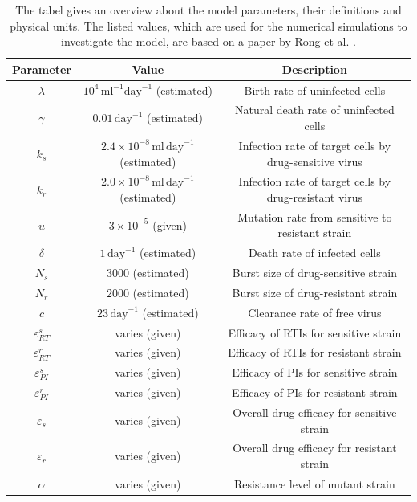 \renewcommand{\arraystretch}{1.25}
\begin{table}
    \centering
        \begin{tabular}{ ccc }
        \hline
        \hline
        Parameter & Value & Description\\[0.5ex]
        \hline
        $\lambda$   & $10^4\,\text{ml}^{-1}\text{day}^{-1}$ (estimated)& Birth rate of uninfected cells\\
        $\gamma$   & $0.01\,\text{day}^{-1}$  (estimated)& Natural death rate of uninfected cells\\
        $k_s$   & $2.4 \times 10^{-8}\,\text{ml}\,\text{day}^{-1}$  (estimated)& Infection rate of target cells by drug-sensitive virus\\
        $k_r$   & $2.0 \times 10^{-8}\,\text{ml}\,\text{day}^{-1}$  (estimated)& Infection rate of target cells by drug-resistant virus\\
        $u$   & $3 \times 10^{-5}$  (given)& Mutation rate from sensitive to resistant strain\\
        $\delta$   & $1\,\text{day}^{-1}$  (estimated)& Death rate of infected cells\\
        $N_s$   & $3000$ (estimated)& Burst size of drug-sensitive strain\\
        $N_r$   & $2000$ (estimated)& Burst size of drug-resistant strain\\
        $c$   & $23\, \text{day}^{-1}$  (estimated)& Clearance rate of free virus\\
        $\varepsilon_{RT}^{s}$  & varies (given)& Efficacy of RTIs for sensitive strain\\
        $\varepsilon_{RT}^{r}$  & varies (given)& Efficacy of RTIs for resistant strain\\
        $\varepsilon_{PI}^{s}$  & varies (given)& Efficacy of PIs for sensitive strain\\
        $\varepsilon_{PI}^{r}$  & varies (given)& Efficacy of PIs for resistant strain\\
        $\varepsilon_{s}$  & varies (given)& Overall drug efficacy for sensitive strain\\
        $\varepsilon_{r}$  & varies (given)& Overall drug efficacy for resistant strain\\
        $\alpha$  & varies (given)& Resistance level of mutant strain\\
        \hline
        \hline
    \end{tabular}
    \caption{The tabel gives an overview about the model parameters, their definitions and physical units.
    The listed values, which are used for the numerical simulations to investigate the model, are based on a paper by Rong et al. \cite{rong2007emergence}.}
    \label{tab:init_parameters}
\end{table}

